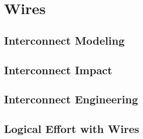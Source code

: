 \section{Wires}

\subsection{Interconnect Modeling}

\subsection{Interconnect Impact}

\subsection{Interconnect Engineering}

\subsection{Logical Effort with Wires}
